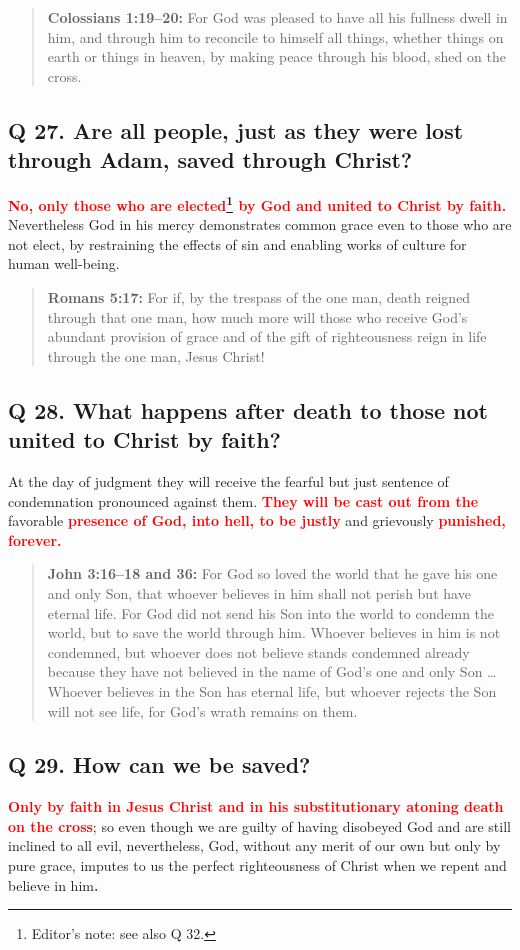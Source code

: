 \documentclass[titlepage]{memoir}
\newcommand\Children[1]{\textbf{\textcolor{red}{#1}}}
\newcommand\Quote[2]{\begin{quote}{\small\textbf{#1:}{ #2}}\end{quote}}
\begin{document}
\Quote{Colossians 1:19--20}{For God was pleased to have all his fullness dwell in him, and through him to reconcile to himself all things, whether things on earth or things in heaven, by making peace through his blood, shed on the cross.}

\subsection{Q 27. Are all people, just as they were lost through Adam, saved through Christ?}
\Children{No, only those who are elected\footnote{Editor's note: see also Q 32.} by God and united to Christ by faith.} Nevertheless God in his mercy demonstrates common grace even to those who are not elect, by restraining the effects of sin and enabling works of culture for human well-being.

\Quote{Romans 5:17}{For if, by the trespass of the one man, death reigned through that one man, how much more will those who receive God's abundant provision of grace and of the gift of righteousness reign in life through the one man, Jesus Christ!}

\subsection{Q 28. What happens after death to those not united to Christ by faith?}
At the day of judgment they will receive the fearful but just sentence of condemnation pronounced against them. \Children{They will be cast out from the} favorable \Children{presence of God, into hell, to be justly} and grievously \Children{punished, forever.}

\Quote{John 3:16--18 and 36\index[joh]{03:36@3:36}}{For God so loved the world that he gave his one and only Son, that whoever believes in him shall not perish but have eternal life. For God did not send his Son into the world to condemn the world, but to save the world through him. Whoever believes in him is not condemned, but whoever does not believe stands condemned already because they have not believed in the name of God's one and only Son {\dots} Whoever believes in the Son has eternal life, but whoever rejects the Son will not see life, for God's wrath remains on them.}

\subsection{Q 29. How can we be saved?}
\Children{Only by faith in Jesus Christ and in his substitutionary atoning death on the cross}; so even though we are guilty of having disobeyed God and are still inclined to all evil, nevertheless, God, without any merit of our own but only by pure grace, imputes to us the perfect righteousness of Christ when we repent and believe in him\Children{.}
\end{document}
